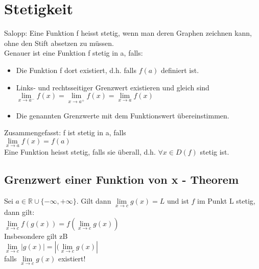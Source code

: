 \documentclass[../main.tex]{subfiles}
\begin{document}
\section{Stetigkeit}
Salopp: Eine Funktion f heisst stetig, wenn man deren Graphen zeichnen kann, ohne den Stift absetzen zu müssen. \\ [7pt]
Genauer ist eine Funktion f stetig in a, falls:
\begin{itemize}
    \item Die Funktion f dort existiert, d.h. falls $f(a)$ definiert ist.
    \item Links- und rechtsseitiger Grenzwert existieren und gleich sind \\ [7pt]
    $\lim\limits_{x\to a^-} f(x) = \lim\limits_{x\to a^+} f(x) = \lim\limits_{x\to a} f(x)$ 
    \item Die genannten Grenzwerte mit dem Funktionswert übereinstimmen.
\end{itemize}
Zusammengefasst: f ist stetig in a, falls \\ [7pt]
$\lim\limits_{x\to a} f(x) = f(a)$ \\ [7pt]
Eine Funktion heisst stetig, falls sie überall, d.h. $\forall x \in D(f)$ stetig ist.

\subsection{Grenzwert einer Funktion von x - Theorem}
Sei $a \in \mathbb{R} \cup \{ -\infty, +\infty\}$. Gilt dann $\lim\limits_{x\to c} g(x)=L$ und ist $f$ im Punkt L stetig, dann gilt: \\ [7pt]
$\lim\limits_{x\to c} f(g(x)) = f(\lim\limits_{x\to c} g(x))$ \\ [7pt]
Insbesondere gilt zB \\ [7pt]
$\lim\limits_{x\to c} |g(x)| = |(\lim\limits_{x\to c} g(x)|$ \\ [7pt]
falls $\lim\limits_{x\to c} g(x)$ existiert!
\end{document}
